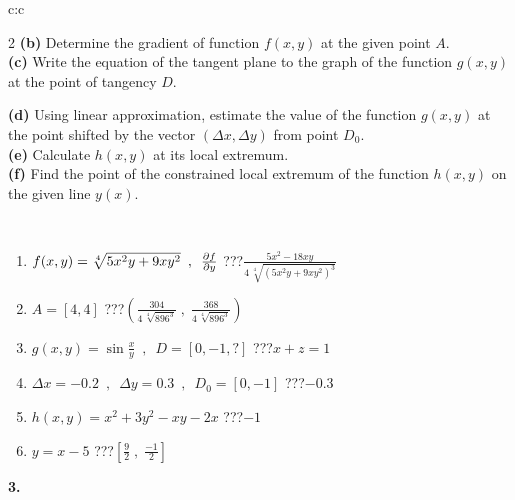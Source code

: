 \documentclass[10pt]{report}
\begin{document}
\begin{tabular}{c:c}
\begin{minipage}[c][104.5mm][t]{0.5\linewidth}
\begin{center}
\begin{minipage}{0.95\linewidth}
\begin{center}
{\begin{multicols}{2}
\textbf{(b)} Determine the gradient of function \(f(x,y)\) at the given point \(A\). \\[1mm]
\textbf{(c)} Write the equation of the tangent plane to the graph of the function \(g(x,y)\) at the point of tangency \(D\). \par \columnbreak
\textbf{(d)} Using linear approximation, estimate the value of the function \(g(x,y)\) at the point shifted by the vector \((\Delta x, \Delta y)\) from point \(D_0\). \\[1mm]
\textbf{(e)} Calculate \(h(x,y)\) at its local extremum. \\[1mm]
\textbf{(f)} Find the point of the constrained local extremum of the function \(h(x,y)\) on the given line \(y(x)\). \\[1mm]
\end{multicols}
}
\end{center}
\end{minipage}
\\[4mm]
\begin{minipage}{0.79\linewidth}
\begin{center}
\begin{varwidth}{\linewidth}
\begin{enumerate}
\normalsizerr
\item $f(x,y) = \sqrt[4]{5x^2y + 9xy^2}\enspace , \enspace \pdv{f}{y}$\quad \dotfill\; ???\;\dotfill \quad $\frac{5x^2-18xy}{4\,\sqrt[4]{(5x^2y+9xy^2)^{3}}}$
\item $A = [4, 4]$\quad \dotfill\; ???\;\dotfill \quad $\left( \frac{304}{4\,\sqrt[4]{896^3}} \;,\; \frac{368}{4\,\sqrt[4]{896^3}} \right)$
\item $g(x,y) = \sin\frac{x}{y} \enspace , \enspace D = [0, -1, ?]$\quad \dotfill\; ???\;\dotfill \quad $x+z=1$
\item $\Delta x = {-0.2} \enspace,\enspace \Delta y = {0.3} \enspace,\enspace D_0 = [0,-1]$\quad \dotfill\; ???\;\dotfill \quad $-0.3$
\item $h(x,y) = x^2+3y^2-xy-2x$\quad \dotfill\; ???\;\dotfill \quad $-1$
\item $y = x-5$\quad \dotfill\; ???\;\dotfill \quad $\left[\frac{9}{2}\;,\;\frac{-1}{2}\right]$
\end{enumerate}
\end{varwidth}
\end{center}
\end{minipage}
\begin{minipage}{0.20\linewidth}
\begin{center}
{\Huge\bfseries 3.} \\[2mm]

\end{center}
\end{minipage}
\end{center}
\end{minipage}
\end{tabular}
\end{document}

